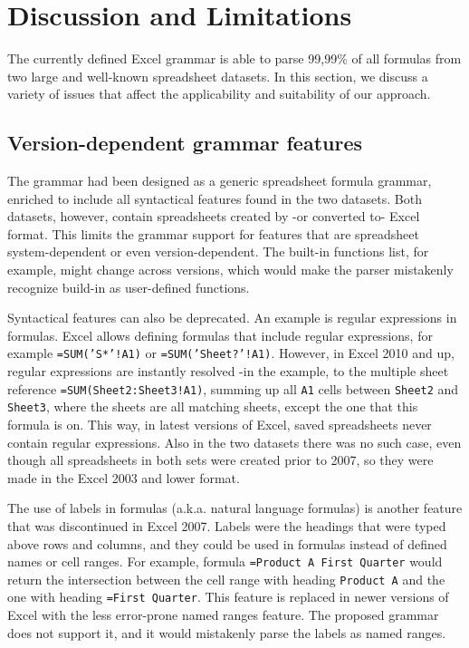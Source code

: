 \documentclass[conference]{IEEEtran}
\begin{document}
\section{Discussion and Limitations}
\label{sec:discussion}
The currently defined Excel grammar is able to parse 99,99\% of all formulas from two large and well-known spreadsheet datasets. In this section, we discuss a variety of issues that affect the applicability and suitability of our approach.

\subsection{Version-dependent grammar features}
The grammar had been designed as a generic spreadsheet formula grammar, enriched to include all syntactical features found in the two datasets. Both datasets, however, contain spreadsheets created by -or converted to- Excel format. This limits the grammar support for features that are spreadsheet system-dependent or even version-dependent. The built-in functions list, for example, might change across versions, which would make the parser mistakenly recognize build-in as user-defined functions.

Syntactical features can also be deprecated. An example is regular expressions in formulas. Excel allows defining formulas that include regular expressions, for example \texttt{=SUM('S*'!A1)} or \texttt{=SUM('Sheet?'!A1)}. However, in Excel 2010 and up, regular expressions are instantly resolved -in the example, to the multiple sheet reference \texttt{=SUM(Sheet2:Sheet3!A1)}, summing up all \texttt{A1} cells between \texttt{Sheet2} and \texttt{Sheet3}, where the sheets are all matching sheets, except the one that this formula is on. This way, in latest versions of Excel, saved spreadsheets never contain regular expressions. Also in the two datasets there was no such case, even though all spreadsheets in both sets were created prior to 2007, so they were made in the Excel 2003 and lower format. 

The use of labels in formulas (a.k.a. natural language formulas) is another feature that was discontinued in Excel 2007. Labels were the headings that were typed above rows and columns, and they could be used in formulas instead of defined names or cell ranges. For example, formula \texttt{=Product A First Quarter} would return the intersection between the cell range with heading \texttt{Product A} and the one with heading \texttt{=First Quarter}. This feature is replaced in newer versions of Excel with the less error-prone named ranges feature. The proposed grammar does not support it, and it would mistakenly parse the labels as named ranges.
\end{document}
